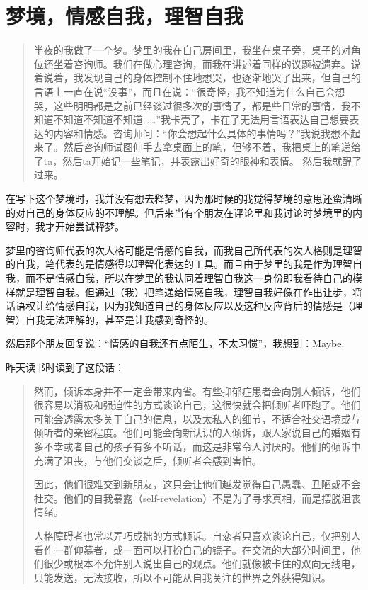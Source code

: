 \chapter{梦境，情感自我，理智自我}




\blockquote{
	半夜的我做了一个梦。梦里的我在自己房间里，我坐在桌子旁，桌子的对角位还坐着咨询师。我们在做心理咨询，而我在讲述着同样的议题\pozhehao{}被遗弃。说着说着，我发现自己的身体控制不住地想哭，也逐渐地哭了出来，但自己的言语上一直在说“没事”，而且在说：“很奇怪，我不知道为什么自己会想哭，这些明明都是之前已经谈过很多次的事情了，都是些日常的事情，我不知道不知道不知道不知道……”我卡壳了，卡在了无法用言语表达自己想要表达的内容和情感。咨询师问：“你会想起什么具体的事情吗？”我说我想不起来了。然后咨询师试图伸手去拿桌面上的笔，但够不着，我把桌上的笔递给了ta，然后ta开始记一些笔记，并表露出好奇的眼神和表情。
	然后我就醒了过来。

}

在写下这个梦境时，我并没有想去释梦，因为那时候的我觉得梦境的意思还蛮清晰的\pozhehao{}对自己的身体反应的不理解。但后来当有个朋友在评论里和我讨论时梦境里的内容时，我才开始尝试释梦。

梦里的咨询师代表的次人格可能是情感的自我，而我自己所代表的次人格则是理智的自我，笔代表的是情感得以理智化表达的工具。而且由于梦里的我是作为理智自我，而不是情感自我，所以在梦里的我认同着理智自我这一身份\pozhehao{}即我看待自己的模样就是理智自我。但通过（我）把笔递给情感自我，理智自我好像在作出让步，将话语权让给情感自我，因为我知道自己的身体反应以及这种反应背后的情感是（理智）自我无法理解的，甚至是让我感到奇怪的。

然后那个朋友回复说：“情感的自我还有点陌生，不太习惯”，我想到：Maybe.

昨天读书时读到了这段话：

\blockquote{
	然而，倾诉本身并不一定会带来内省。有些抑郁症患者会向别人倾诉，他们很容易以消极和强迫性的方式谈论自己，这很快就会把倾听者吓跑了。他们可能会透露太多关于自己的信息，以及太私人的细节，不适合社交语境或与倾听者的亲密程度。他们可能会向新认识的人倾诉，跟人家说自己的婚姻有多不幸或者自己的孩子有多不听话，而这是非常令人讨厌的。他们的倾诉中充满了沮丧，与他们交谈之后，倾听者会感到害怕。

	因此，他们很难交到新朋友，这只会让他们越发觉得自己愚蠢、丑陋或不会社交。他们的自我暴露（self-revelation）不是为了寻求真相，而是摆脱沮丧情绪。

	人格障碍者也常以弄巧成拙的方式倾诉。自恋者只喜欢谈论自己，仅把别人看作一群仰慕者，或一面可以打扮自己的镜子。在交流的大部分时间里，他们很少或根本不允许别人说出自己的观点。他们就像被卡住的双向无线电，只能发送，无法接收，所以不可能从自我关注的世界之外获得知识。

}

